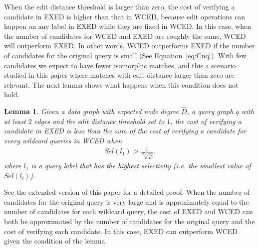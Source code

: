 \documentclass{sigmod}
\newtheorem{lemma}{Lemma}
\begin{document}
When the edit distance threshold is larger than zero, the cost of verifying a candidate in EXED is higher than that in WCED, because edit operations can happen on any label in EXED while they are fixed in WCED. In this case, when the number of candidates for WCED and EXED are roughly the same, WCED will outperform EXED. In other words, WCED outperforms EXED if the number of candidates for the original query is small (See Equation~\ref{eq:Cnq}). With few candidates we expect to have fewer isomorphic matches, and this a scenario studied in this paper where matches with edit distance larger than zero are relevant. The next lemma shows what happens when this condition does not hold.

\begin {lemma}
\label{lemma:comp}
Given a data graph with expected node degree $\hat{D}$, a query graph $q$ with at least $2$ edges and the edit distance threshold set to $1$, 
the cost of verifying a candidate in EXED is less than the sum of the cost of verifying a candidate for every wildcard queries in WCED when
\begin{align}
\label{ineq:constraint}
Sel(l_1) > \frac{1}{\sqrt[|E_q|]{\hat{D}}}.
\end{align}
where $l_1$ is a query label that has the highest selectivity (i.e. the smallest value of $Sel(l_i)$).
\end{lemma}

See the extended version of this paper \cite{eteq2016} for a detailed proof. 
When the number of candidates for the original query is very large and is approximately equal to the number of candidates for each wildcard query, the cost of EXED and WCED can both be approximated by  the number of candidates for the original query and the cost of verifying each candidate. In this case, EXED can outperform WCED given the condition of the lemma.
\end{document}
